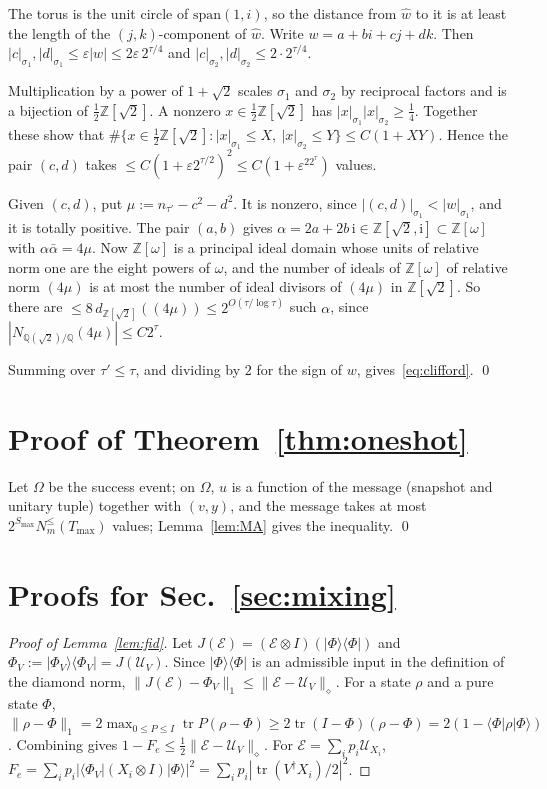 \documentclass[aps,prx,twocolumn,superscriptaddress,nofootinbib,longbibliography]{revtex4-2}
\theoremstyle{plain}
\theoremstyle{definition}
\theoremstyle{remark}
\newcommand{\Z}{\mathbb{Z}}
\newcommand{\Q}{\mathbb{Q}}
\newcommand{\tr}{\operatorname{tr}}
\begin{document}
The torus is the unit circle of $\mathrm{span}(1,i)$, so the distance from $\hat w$ to it is at least the length of the $(j,k)$-component of $\hat w$. Write $w=a+bi+cj+dk$. Then $|c|_{\sigma_1},|d|_{\sigma_1}\le\varepsilon|w|\le2\varepsilon\,2^{\tau/4}$ and $|c|_{\sigma_2},|d|_{\sigma_2}\le2\cdot2^{\tau/4}$.

Multiplication by a power of $1+\sqrt2$ scales $\sigma_1$ and $\sigma_2$ by reciprocal factors and is a bijection of $\tfrac12\Z[\sqrt2]$. A nonzero $x\in\tfrac12\Z[\sqrt2]$ has $|x|_{\sigma_1}|x|_{\sigma_2}\ge\tfrac14$. Together these show that $\#\{x\in\tfrac12\Z[\sqrt2]:|x|_{\sigma_1}\le X,\ |x|_{\sigma_2}\le Y\}\le C(1+XY)$. Hence the pair $(c,d)$ takes $\le C(1+\varepsilon2^{\tau/2})^2\le C(1+\varepsilon^22^\tau)$ values.

Given $(c,d)$, put $\mu:=n_{\tau'}-c^2-d^2$. It is nonzero, since $|(c,d)|_{\sigma_1}<|w|_{\sigma_1}$, and it is totally positive. The pair $(a,b)$ gives $\alpha=2a+2b\,\mathrm i\in\Z[\sqrt2,\mathrm i]\subset\Z[\omega]$ with $\alpha\bar\alpha=4\mu$. Now $\Z[\omega]$ is a principal ideal domain whose units of relative norm one are the eight powers of $\omega$, and the number of ideals of $\Z[\omega]$ of relative norm $(4\mu)$ is at most the number of ideal divisors of $(4\mu)$ in $\Z[\sqrt2]$. So there are $\le8\,d_{\Z[\sqrt2]}((4\mu))\le2^{O(\tau/\log\tau)}$ such $\alpha$, since $|N_{\Q(\sqrt2)/\Q}(4\mu)|\le C2^{\tau}$.

Summing over $\tau'\le\tau$, and dividing by $2$ for the sign of $w$, gives~\eqref{eq:clifford}. \qed

\section{Proof of Theorem~\ref{thm:oneshot}}
Let $\Omega$ be the success event; on $\Omega$, $u$ is a function of the message (snapshot and unitary tuple) together with $(v,y)$, and the message takes at most $2^{S_{\max}}N^{\le}_m(T_{\max})$ values; Lemma~\ref{lem:MA} gives the inequality. \qed

\section{\texorpdfstring{Proofs for Sec.~\ref{sec:mixing}}{Proofs for the mixing section}}\label{app:mixing}

\begin{proof}[Proof of Lemma~\ref{lem:fid}]
Let $J(\mathcal E)=(\mathcal E\otimes I)(|\Phi\rangle\langle\Phi|)$ and $\Phi_V:=|\Phi_V\rangle\langle\Phi_V|=J(\mathcal U_V)$. Since $|\Phi\rangle\langle\Phi|$ is an admissible input in the definition of the diamond norm, $\|J(\mathcal E)-\Phi_V\|_1\le\|\mathcal E-\mathcal U_V\|_\diamond$. For a state $\rho$ and a pure state $\Phi$, $\|\rho-\Phi\|_1=2\max_{0\le P\le I}\tr P(\rho-\Phi)\ge2\tr(I-\Phi)(\rho-\Phi)=2(1-\langle\Phi|\rho|\Phi\rangle)$. Combining gives $1-F_e\le\tfrac12\|\mathcal E-\mathcal U_V\|_\diamond$. For $\mathcal E=\sum_ip_i\mathcal U_{X_i}$, $F_e=\sum_ip_i|\langle\Phi_V|(X_i\otimes I)|\Phi\rangle|^2=\sum_ip_i|\tr(V^\dagger X_i)/2|^2$.
\end{proof}
\end{document}
